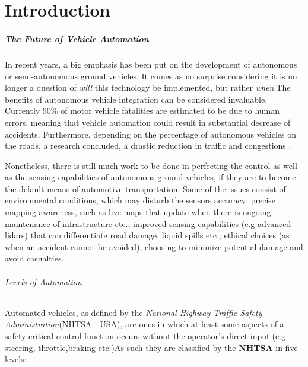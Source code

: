 \chapter{Introduction}\label{ch:introduction}

\paragraph{The Future of Vehicle Automation} 

In recent years, a big emphasis has been put on the development of autonomous or semi-autonomous ground vehicles. It comes as no surprise considering it is no longer a question of \textit{will} this technology be implemented, but rather \textit{when}.The benefits of autonomous vehicle integration can be considered invaluable. Currently 90\% of motor vehicle fatalities are estimated to be due to human errors, meaning that vehicle automation could result in substantial decrease of accidents. Furthermore, depending on the percentage of autonomous vehicles on the roads, a research concluded, a drastic reduction in traffic and congestions .\cite{DriverlessCar}

Nonetheless, there is still much work to be done in perfecting the control as well as the sensing capabilities of autonomous ground vehicles, if they are to become the default means of automotive transportation. Some of the issues consist of environmental conditions, which may disturb the sensors accuracy; precise mapping awareness, such as live maps that update when there is ongoing maintenance of infrastructure etc.; improved sensing capabilities (e.g advanced lidars) that can differentiate road damage, liquid spills etc.; ethical choices (as when an accident cannot be avoided), choosing to minimize potential damage and avoid casualties.\cite{DriverlessCar}

\subparagraph{Levels of Automation} 

Automated vehicles, as defined by the \textit{National Highway Traffic Safety Administration}(NHTSA - USA), are ones in which at least some aspects of a safety-critical control function occurs without the operator's direct input.(e.g steering, throttle,braking etc.)As such they are classified by the \textbf{NHTSA} in five levels:\cite{NHTSA}

